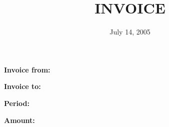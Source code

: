 \documentclass[12pt]{article}
\title{INVOICE}
\date{July 14, 2005}
\begin{document}
\maketitle

\textbf{Invoice from:}

\textbf{Invoice to:}

\textbf{Period:}

\textbf{Amount:}
\end{document}
